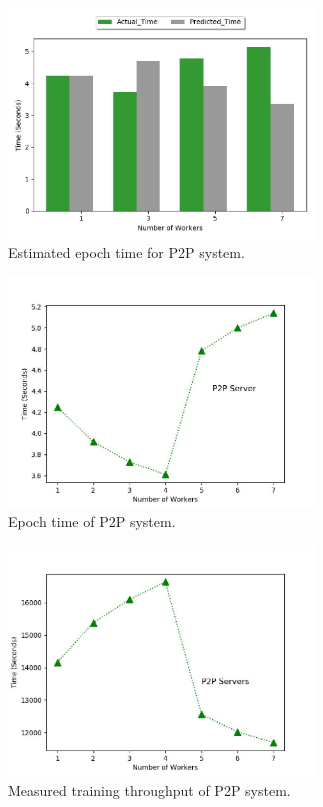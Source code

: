 \documentclass[conference]{IEEEtran}
\begin{document}
\begin{figure}[htb]
  \includegraphics[width=3.2in]{Fig/p2pmodel.jpg}
  \caption{Estimated epoch time for P2P system.}
  \label{fig:p2pmodel}
\end{figure}

\begin{figure}[htb]
  \includegraphics[width=3.2in]{Fig/p2platency.jpg}
  \caption{Epoch time of P2P system.}
  \label{fig:p2platency}
\end{figure}

\begin{figure}[htb]
  \includegraphics[width=3.2in]{Fig/p2pthroughput.jpg}
  \caption{Measured training throughput of P2P system.}
  \label{fig:p2pthroughput}
\end{figure}
\end{document}
